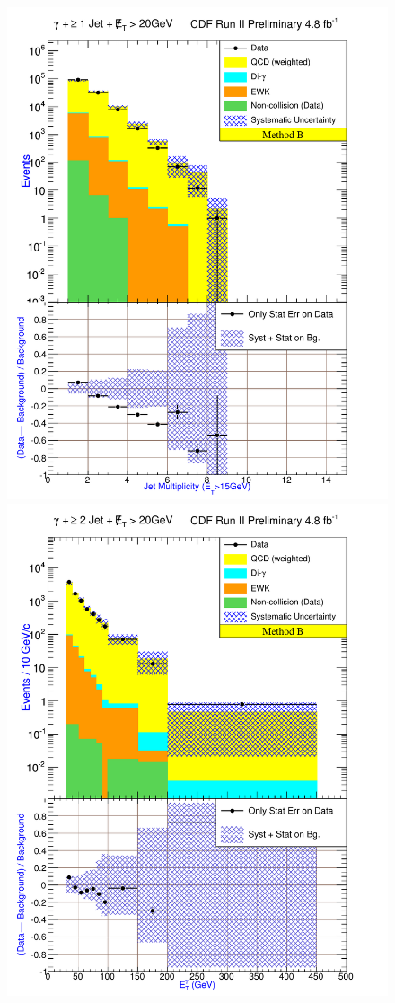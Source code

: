 \begin{figure}[h!]
{\includegraphics[keepaspectratio=true, scale=\resultsHistScale]{G30JetsMet20_MtdB_plot1_NJet.pdf}}
{\includegraphics[keepaspectratio=true, scale=\resultsHistScale]{G30JetsMet20_MtdB_plot2_Et_pho.pdf}}

\end{figure}
